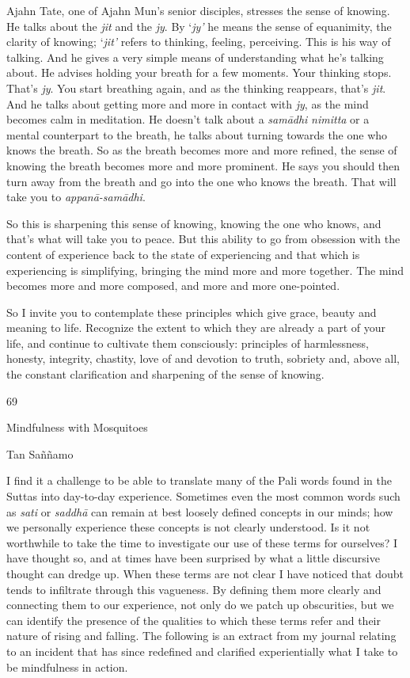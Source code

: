 Ajahn Tate, one of Ajahn Mun's senior disciples, stresses the sense of
knowing. He talks about the \emph{jit} and the \emph{jy}. By `\emph{jy'}
he means the sense of equanimity, the clarity of knowing; `\emph{jit'}
refers to thinking, feeling, perceiving. This is his way of talking. And
he gives a very simple means of understanding what he's talking about.
He advises holding your breath for a few moments. Your thinking stops.
That's \emph{jy}. You start breathing again, and as the thinking
reappears, that's \emph{jit}. And he talks about getting more and more
in contact with \emph{jy}, as the mind becomes calm in meditation. He
doesn't talk about a \emph{samādhi} \emph{nimitta} or a mental
counterpart to the breath, he talks about turning towards the one who
knows the breath. So as the breath becomes more and more refined, the
sense of knowing the breath becomes more and more prominent. He says you
should then turn away from the breath and go into the one who knows the
breath. That will take you to \emph{appanā-samādhi}.

So this is sharpening this sense of knowing, knowing the one who knows,
and that's what will take you to peace. But this ability to go from
obsession with the content of experience back to the state of
experiencing and that which is experiencing is simplifying, bringing the
mind more and more together. The mind becomes more and more composed,
and more and more one-pointed.

So I invite you to contemplate these principles which give grace, beauty
and meaning to life. Recognize the extent to which they are already a
part of your life, and continue to cultivate them consciously:
principles of harmlessness, honesty, integrity, chastity, love of and
devotion to truth, sobriety and, above all, the constant clarification
and sharpening of the sense of knowing.



69

Mindfulness with Mosquitoes

Tan Saññamo

I find it a challenge to be able to translate many of the Pali words
found in the Suttas into day-to-day experience. Sometimes even the most
common words such as \emph{sati} or \emph{saddhā} can remain at best
loosely defined concepts in our minds; how we personally experience
these concepts is not clearly understood. Is it not worthwhile to take
the time to investigate our use of these terms for ourselves? I have
thought so, and at times have been surprised by what a little discursive
thought can dredge up. When these terms are not clear I have noticed
that doubt tends to infiltrate through this vagueness. By defining them
more clearly and connecting them to our experience, not only do we patch
up obscurities, but we can identify the presence of the qualities to
which these terms refer and their nature of rising and falling. The
following is an extract from my journal relating to an incident that has
since redefined and clarified experientially what I take to be
mindfulness in action.

